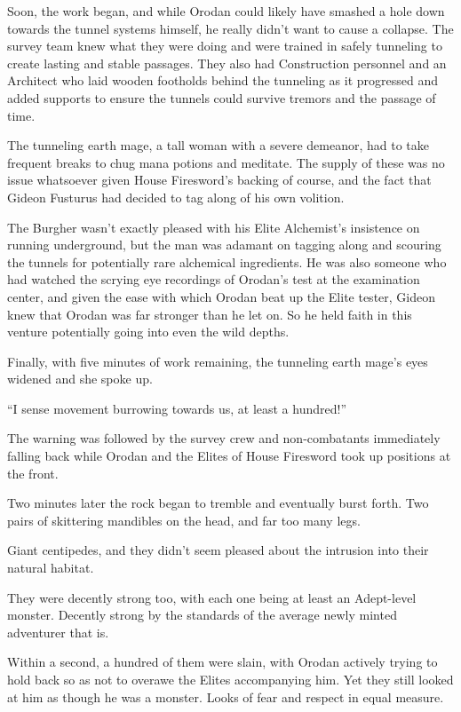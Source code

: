 \documentclass[a4paper,10pt]{book}
\begin{document}
Soon, the work began, and while Orodan could likely have smashed a hole down towards the tunnel systems himself, he really didn’t want to cause a collapse. The survey team knew what they were doing and were trained in safely tunneling to create lasting and stable passages. They also had Construction personnel and an Architect who laid wooden footholds behind the tunneling as it progressed and added supports to ensure the tunnels could survive tremors and the passage of time.\par
The tunneling earth mage, a tall woman with a severe demeanor, had to take frequent breaks to chug mana potions and meditate. The supply of these was no issue whatsoever given House Firesword’s backing of course, and the fact that Gideon Fusturus had decided to tag along of his own volition.\par
The Burgher wasn’t exactly pleased with his Elite Alchemist’s insistence on running underground, but the man was adamant on tagging along and scouring the tunnels for potentially rare alchemical ingredients. He was also someone who had watched the scrying eye recordings of Orodan’s test at the examination center, and given the ease with which Orodan beat up the Elite tester, Gideon knew that Orodan was far stronger than he let on. So he held faith in this venture potentially going into even the wild depths.\par
Finally, with five minutes of work remaining, the tunneling earth mage’s eyes widened and she spoke up.\par
“I sense movement burrowing towards us, at least a hundred!”\par
The warning was followed by the survey crew and non-combatants immediately falling back while Orodan and the Elites of House Firesword took up positions at the front.\par
Two minutes later the rock began to tremble and eventually burst forth. Two pairs of skittering mandibles on the head, and far too many legs.\par
Giant centipedes, and they didn’t seem pleased about the intrusion into their natural habitat.\par
They were decently strong too, with each one being at least an Adept-level monster. Decently strong by the standards of the average newly minted adventurer that is.\par
Within a second, a hundred of them were slain, with Orodan actively trying to hold back so as not to overawe the Elites accompanying him. Yet they still looked at him as though he was a monster. Looks of fear and respect in equal measure.\par
\end{document}
